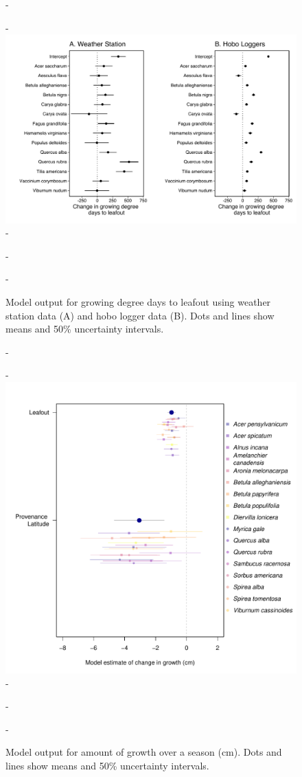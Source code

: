 \documentclass{article}\usepackage[]{graphicx}\usepackage[]{color}
\begin{document}
{{\begin{figure} [H]
  -\begin{center}
  -\includegraphics[width=16cm]{..//analyses/figures/muplot_compare_lo.pdf}
  -\caption{Model output for growing degree days to leafout using weather station data (A) and hobo logger data (B). Dots and lines show means and 50\% uncertainty intervals.}\label{fig:compare}
  -\end{center}
  -\end{figure}}
  
{\begin{figure} [H]
  -\begin{center}
  -\includegraphics[width=12cm]{..//analyses/figures/cg_height.pdf}
  -\caption{Model output for amount of growth over a season (cm). Dots and lines show means and 50\% uncertainty intervals.}\label{fig:cg}
  -\end{center}
  -\end{figure}}

}
\end{document}

